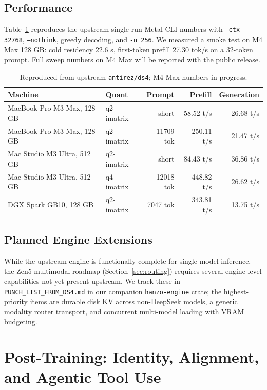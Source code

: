 \documentclass[11pt,a4paper]{article}
\begin{document}
\subsection{Performance}

Table~\ref{tab:speed} reproduces the upstream single-run Metal CLI numbers with
\texttt{--ctx 32768}, \texttt{--nothink}, greedy decoding, and \texttt{-n 256}. We measured a smoke
test on M4 Max 128 GB: cold residency 22.6 s, first-token prefill 27.30 tok/s on a 32-token prompt.
Full sweep numbers on M4 Max will be reported with the public release.

\begin{table}[H]
\centering
\begin{tabular}{llrrr}
\toprule
Machine & Quant & Prompt & Prefill & Generation \\
\midrule
MacBook Pro M3 Max, 128 GB & q2-imatrix & short & 58.52 t/s & 26.68 t/s \\
MacBook Pro M3 Max, 128 GB & q2-imatrix & 11709 tok & 250.11 t/s & 21.47 t/s \\
Mac Studio M3 Ultra, 512 GB & q2-imatrix & short & 84.43 t/s & 36.86 t/s \\
Mac Studio M3 Ultra, 512 GB & q4-imatrix & 12018 tok & 448.82 t/s & 26.62 t/s \\
DGX Spark GB10, 128 GB & q2-imatrix & 7047 tok & 343.81 t/s & 13.75 t/s \\
\bottomrule
\end{tabular}
\caption{Reproduced from upstream \texttt{antirez/ds4}; M4 Max numbers in progress.}
\label{tab:speed}
\end{table}

\subsection{Planned Engine Extensions}

While the upstream engine is functionally complete for single-model inference, the Zen5 multimodal
roadmap (Section~\ref{sec:routing}) requires several engine-level capabilities not yet present
upstream. We track these in \texttt{PUNCH\_LIST\_FROM\_DS4.md} in our companion \texttt{hanzo-engine}
crate; the highest-priority items are durable disk KV across non-DeepSeek models, a generic
modality router transport, and concurrent multi-model loading with VRAM budgeting.

\section{Post-Training: Identity, Alignment, and Agentic Tool Use}
\label{sec:posttrain}
\end{document}
